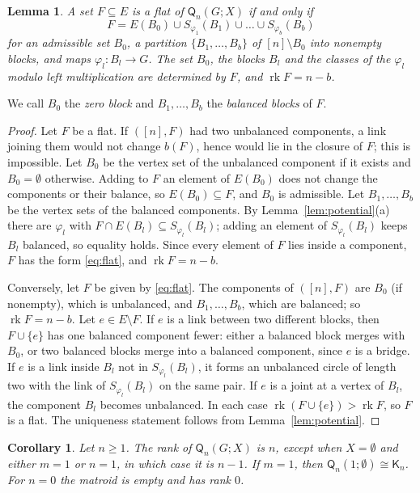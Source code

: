 \documentclass[11pt]{amsart}
\newtheorem{lemma}[theorem]{Lemma}
\newtheorem{corollary}[theorem]{Corollary}
\theoremstyle{definition}
\theoremstyle{remark}
\numberwithin{equation}{section}
\newcommand{\Q}{\mathsf{Q}}
\newcommand{\K}{\mathsf{K}}
\newcommand{\rk}{\operatorname{rk}}
\begin{document}
\begin{lemma}\label{lem:flats}
A set $F\subseteq E$ is a flat of $\Q_n(G;X)$ if and only if
\begin{equation}\label{eq:flat}
F=E(B_0)\cup S_{\varphi_1}(B_1)\cup\dots\cup S_{\varphi_b}(B_b)
\end{equation}
for an admissible set $B_0$, a partition $\{B_1,\dots,B_b\}$ of $[n]\setminus B_0$ into nonempty blocks, and maps $\varphi_l\colon B_l\to G$. The set $B_0$, the blocks $B_l$ and the classes of the $\varphi_l$ modulo left multiplication are determined by $F$, and $\rk F=n-b$.
\end{lemma}

We call $B_0$ the \emph{zero block} and $B_1,\dots,B_b$ the \emph{balanced blocks} of $F$.

\begin{proof}
Let $F$ be a flat. If $([n],F)$ had two unbalanced components, a link joining them would not change $b(F)$, hence would lie in the closure of $F$; this is impossible. Let $B_0$ be the vertex set of the unbalanced component if it exists and $B_0=\emptyset$ otherwise. Adding to $F$ an element of $E(B_0)$ does not change the components or their balance, so $E(B_0)\subseteq F$, and $B_0$ is admissible. Let $B_1,\dots,B_b$ be the vertex sets of the balanced components. By Lemma~\ref{lem:potential}(a) there are $\varphi_l$ with $F\cap E(B_l)\subseteq S_{\varphi_l}(B_l)$; adding an element of $S_{\varphi_l}(B_l)$ keeps $B_l$ balanced, so equality holds. Since every element of $F$ lies inside a component, $F$ has the form \eqref{eq:flat}, and $\rk F=n-b$.

Conversely, let $F$ be given by \eqref{eq:flat}. The components of $([n],F)$ are $B_0$ (if nonempty), which is unbalanced, and $B_1,\dots,B_b$, which are balanced; so $\rk F=n-b$. Let $e\in E\setminus F$. If $e$ is a link between two different blocks, then $F\cup\{e\}$ has one balanced component fewer: either a balanced block merges with $B_0$, or two balanced blocks merge into a balanced component, since $e$ is a bridge. If $e$ is a link inside $B_l$ not in $S_{\varphi_l}(B_l)$, it forms an unbalanced circle of length two with the link of $S_{\varphi_l}(B_l)$ on the same pair. If $e$ is a joint at a vertex of $B_l$, the component $B_l$ becomes unbalanced. In each case $\rk(F\cup\{e\})>\rk F$, so $F$ is a flat. The uniqueness statement follows from Lemma~\ref{lem:potential}.
\end{proof}

\begin{corollary}\label{cor:rank}
Let $n\ge1$. The rank of $\Q_n(G;X)$ is $n$, except when $X=\emptyset$ and either $m=1$ or $n=1$, in which case it is $n-1$. If $m=1$, then $\Q_n(1;\emptyset)\cong\K_n$. For $n=0$ the matroid is empty and has rank $0$.
\end{corollary}
\end{document}
